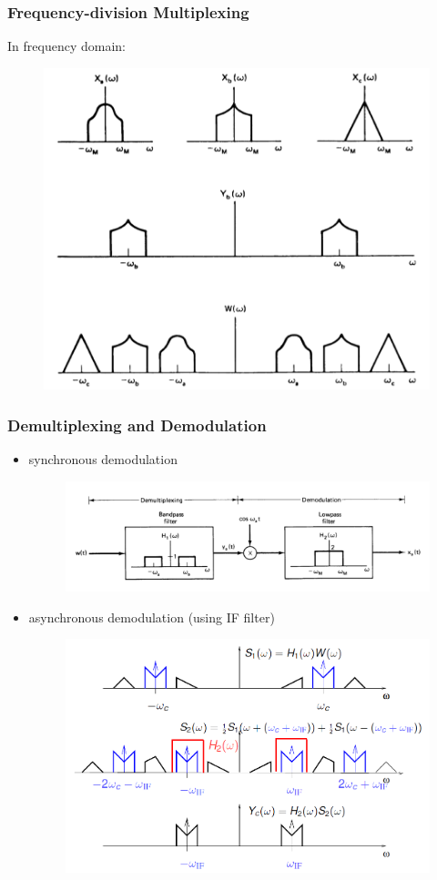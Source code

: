 \documentclass{beamer}
\begin{document}
\begin{frame}
\frametitle{Frequency-division Multiplexing}
In frequency domain:
\begin{figure}
\includegraphics[width=0.6\linewidth]{multi2}
\end{figure}
\end{frame}

\begin{frame}
\frametitle{Demultiplexing and Demodulation}
\begin{itemize}
\item synchronous demodulation
\begin{figure}
\includegraphics[width=0.7\linewidth]{multi3}
\end{figure}
\item asynchronous demodulation (using IF filter)
\begin{figure}
\includegraphics[width=0.5\linewidth]{multi4}
\end{figure}
\end{itemize}
\end{frame}
\end{document}
